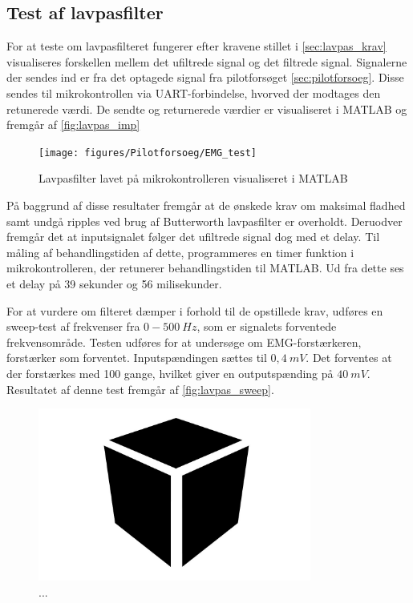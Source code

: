 \subsection{Test af lavpasfilter}
For at teste om lavpasfilteret fungerer efter kravene stillet i \autoref{sec:lavpas_krav} visualiseres forskellen mellem det ufiltrede signal og det filtrede signal. Signalerne der sendes ind er fra det optagede signal fra pilotforsøget \autoref{sec:pilotforsoeg}. Disse sendes til mikrokontrollen via UART-forbindelse, hvorved der modtages den retunerede værdi. De sendte og returnerede værdier er visualiseret i MATLAB og fremgår af \autoref{fig:lavpas_imp}

\begin{figure}[H]
\centering
\texttt{[image: figures/Pilotforsoeg/EMG\_test]}
\caption{Lavpasfilter lavet på mikrokontrolleren visualiseret i MATLAB}
\label{fig:lavpas_imp}
\end{figure}

På baggrund af disse resultater fremgår at de ønskede krav om maksimal fladhed samt undgå ripples ved brug af Butterworth lavpasfilter er overholdt. 
Deruodver fremgår det at inputsignalet følger det ufiltrede signal dog med et delay. Til måling af behandlingstiden af dette, programmeres en timer funktion i mikrokontrolleren, der retunerer behandlingstiden til MATLAB. Ud fra dette ses et delay på 39 sekunder og 56 milisekunder.



For at vurdere om filteret dæmper i forhold til de opstillede krav, udføres en sweep-test af frekvenser fra $0-500~Hz$, som er signalets forventede frekvensområde. Testen udføres for at undersøge om EMG-forstærkeren, forstærker som forventet. Inputspændingen sættes til $0,4~mV$. Det forventes at der forstærkes med 100 gange, hvilket giver en outputspænding på $40~mV$. Resultatet af denne test fremgår af \autoref{fig:lavpas_sweep}. 


\begin{figure}[H]
\centering
\includegraphics[width=0.8\textwidth]{figures/Pilotforsoeg/blackbox}
\caption{...}
\label{fig:lavps_sweep}
\end{figure}

